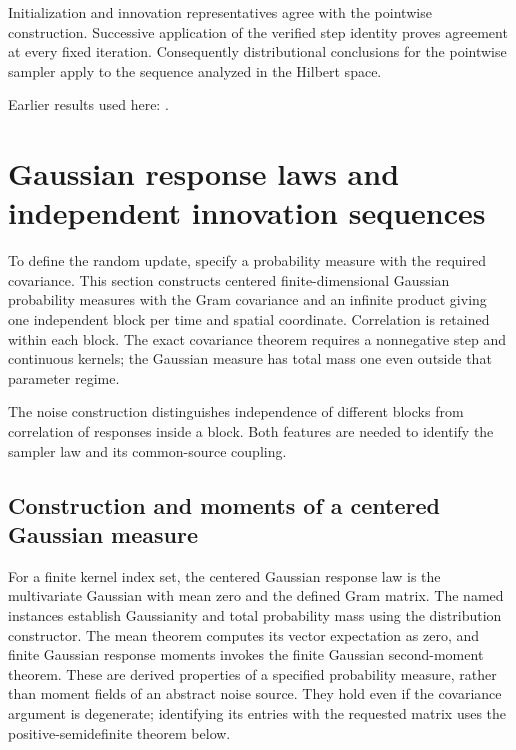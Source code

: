 \documentclass[11pt,a4paper]{report}
\begin{document}
Initialization and innovation representatives agree with the pointwise construction. Successive application of the verified step identity proves agreement at every fixed iteration. Consequently distributional conclusions for the pointwise sampler apply to the sequence analyzed in the Hilbert space.



Earlier results used here: \cite[Section~3.13.2]{LangevinLean2026ULASC}.
\section{\texorpdfstring{Gaussian response laws and independent innovation sequences}{Gaussian response laws and independent innovation sequences}}
\label{proof-module-KineticLangevin-Gaussian-lean}


To define the random update, specify a probability measure with the required covariance. This section constructs centered finite-dimensional Gaussian probability measures with the Gram covariance and an infinite product giving one independent block per time and spatial coordinate. Correlation is retained within each block. The exact covariance theorem requires a nonnegative step and continuous kernels; the Gaussian measure has total mass one even outside that parameter regime.



The noise construction distinguishes independence of different blocks from correlation of responses inside a block. Both features are needed to identify the sampler law and its common-source coupling.

\subsection{\texorpdfstring{Construction and moments of a centered Gaussian measure}{Construction and moments of a centered Gaussian measure}}
\label{report-step-KineticLangevin-Gaussian-lean-1}


For a finite kernel index set, the centered Gaussian response law is the multivariate Gaussian with mean zero and the defined Gram matrix. The named instances establish Gaussianity and total probability mass using the distribution constructor. The mean theorem computes its vector expectation as zero, and finite Gaussian response moments invokes the finite Gaussian second-moment theorem. These are derived properties of a specified probability measure, rather than moment fields of an abstract noise source. They hold even if the covariance argument is degenerate; identifying its entries with the requested matrix uses the positive-semidefinite theorem below.
\end{document}
